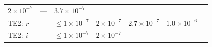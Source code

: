 \documentclass[DM,lsstdraft,toc]{lsstdoc}
\begin{document}
\begin{longtable}[]{@{}lllllll@{}}
\begin{minipage}[t]{0.14\columnwidth}
\(2\times10^{-7}\)\strut
\end{minipage} & \begin{minipage}[t]{0.12\columnwidth}\raggedright\strut
---\strut
\end{minipage} & \begin{minipage}[t]{0.12\columnwidth}\raggedright\strut
\(3.7\times10^{-7}\)\strut
\end{minipage} & \begin{minipage}[t]{0.17\columnwidth}\raggedright\strut
\strut
\end{minipage}\tabularnewline
\begin{minipage}[t]{0.12\columnwidth}\raggedright\strut
TE2: \emph{r}\strut
\end{minipage} & \begin{minipage}[t]{0.06\columnwidth}\raggedright\strut
---\strut
\end{minipage} & \begin{minipage}[t]{0.14\columnwidth}\raggedright\strut
\(\leq 1\times10^{-7}\)\strut
\end{minipage} & \begin{minipage}[t]{0.14\columnwidth}\raggedright\strut
\(2\times10^{-7}\)\strut
\end{minipage} & \begin{minipage}[t]{0.12\columnwidth}\raggedright\strut
\(2.7\times10^{-7}\)\strut
\end{minipage} & \begin{minipage}[t]{0.12\columnwidth}\raggedright\strut
\(1.0\times10^{-6}\)\strut
\end{minipage} & \begin{minipage}[t]{0.17\columnwidth}\raggedright\strut
\strut
\end{minipage}\tabularnewline
\begin{minipage}[t]{0.12\columnwidth}\raggedright\strut
TE2: \emph{i}\strut
\end{minipage} & \begin{minipage}[t]{0.06\columnwidth}\raggedright\strut
---\strut
\end{minipage} & \begin{minipage}[t]{0.14\columnwidth}\raggedright\strut
\(\leq 1\times10^{-7}\)\strut
\end{minipage} & \begin{minipage}[t]{0.14\columnwidth}\raggedright\strut
\(2\times10^{-7}\)\strut
\end{minipage} & \begin{minipage}[t]{0.12\columnwidth}\raggedright\strut

\end{minipage}
\end{longtable}
\end{document}

